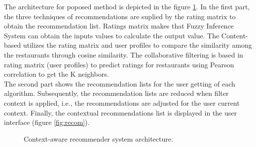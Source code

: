 The architecture for poposed method is depicted in the figure
\ref{fig:archit}.  In the first part, the three techniques of
recommendations are suplied by the rating matrix to obtain the
recommendation list. Ratings matrix makes that Fuzzy Inference System
can obtain the inputs values to calculate the output value. The
Content-based utilizes the rating matrix and user profiles to compare
the similarity among the restaurants through cosine similarity. The
collaborative filtering is based in rating matrix (user profiles) to
predict ratings for restaurants using Pearson correlation to get the K
neighbors.\\ 
The second part shows the recommendation lists for the user getting of
each algorithm. Subsequently, the recommendation lists are reduced
when filter context is applied, i.e., the recommendations are adjusted
for the user current context. Finally, the contextual recommendations
list is displayed in the user interface (figure \ref{fig:recom}).
\begin{figure}
\centering 
{}
\caption{Context-aware recommender system architecture.}
\label{fig:archit}       %
\end{figure}





